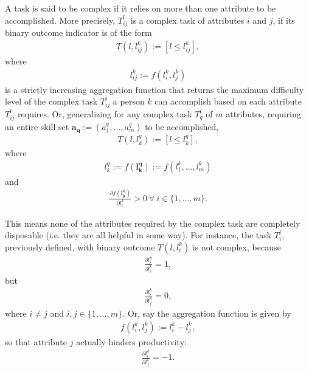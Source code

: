 \documentclass[hidelinks, nonatbib]{elsarticle}
\begin{document}
\begin{definition}
    \label{complex_task}
    A task is said to be complex if it relies on more than one attribute to be accomplished. More precisely, $T_{ij}^{l}$ is a complex task of attributes $i$ and $j$, if its binary outcome indicator is of the form
    \begin{gather}
        T(l, l_{ij}^{k})
        :=
        [l \leq l_{ij}^{k}],
    \end{gather}
    where
    \begin{gather}
        l_{ij}^{k} := f(l_{i}^{k}, l_{j}^{k})
    \end{gather}
    is a strictly increasing aggregation function that returns the maximum difficulty level of the complex task $T_{ij}^{l}$ a person $k$ can accomplish based on each attribute $T_{ij}^{l}$ requires. Or, generalizing for any complex task $T_{q}^{l}$ of $m$ attributes, requiring an entire skill set $\boldsymbol{a_q} := (a_{1}^{q}, \dots, a_{m}^{q})$ to be accomplished, 
    \begin{gather}
        T(l, l_{k}^{q})
        :=
        [l \leq l_{k}^{q}],
    \end{gather}
    where
    \begin{gather}
        l_{k}^{q}
        := 
        f(\boldsymbol{l_{k}^{q}})
        :=
        f(l_{1}^{k}, \dots, l_{m}^{k})
    \end{gather}
    and 
    \begin{gather}
        \frac{
            \partial
            f(\boldsymbol{l_{k}^{q}})
        }{
            \partial 
            l_{i}^{k}
        } > 0
        \
        \forall 
        \
        i \in \{1, \dots, m\}
        .
    \end{gather}
        
    This means none of the attributes required by the complex task are completely disposable (i.e. they are all helpful in some way). For instance, the task $T_{i}^{l}$, previously defined, with binary outcome $T(l, l_{i}^{k})$ is not complex, because
    \begin{gather}
        \frac{
            \partial
            l_{i}^{k}
        }{
            \partial 
            l_{i}^{k}
        } = 1
        ,
    \end{gather}
    but
    \begin{gather}
        \frac{
            \partial
            l_{i}^{k}
        }{
            \partial 
            l_{j}^{k}
        } = 0
        , 
    \end{gather}
    where $i \neq j$ and $i, j \in \{1, \dots, m\}$. Or, say the aggregation function is given by
    \begin{gather}
        f(l_{i}^{k}, l_{j}^{k})
        := 
        l_{i}^{k} - l_{j}^{k}
        ,
    \end{gather}
    so that attribute $j$ actually hinders productivity:
    \begin{gather}
        \frac{
            \partial
            l_{i}^{k}
        }{
            \partial 
            l_{j}^{k}
        } = -1
        .
    \end{gather}
        

\end{definition}
\end{document}
